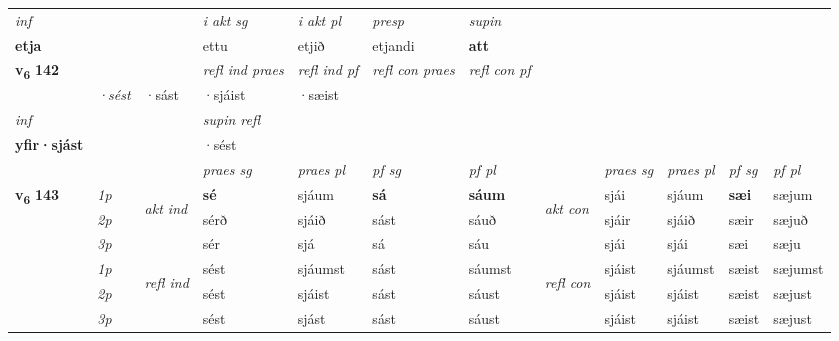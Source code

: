 \begin{longtable}[l]{X>{\footnotesize\itshape}llXXXXlXXXX}
   {\textit{inf}} & &  & \textit{i akt sg} & \textit{i akt pl}   & \textit{presp} & \textit{supin}   \\*
  {\textbf{etja}} & && ettu  & etjið   & etjandi &  \textbf{att}   \\*

\midrule

\multirow{2}{*}{{{\textbf{v{\textsubscript{6}}} \Large{\textbf{142}}}}}  & &&\textit{refl ind praes} & \textit{refl ind pf} & \textit{refl con praes} & \textit{refl con pf} \\*
\multicolumn{3}{r}{\textit{e-m}}& ·sést & ·sást & ·sjáist & ·sæist \\*

\cmidrule{4-7}
   {\textit{inf}} & &       & \textit{supin refl}  \\*
  {\textbf{yfir\allowbreak ·sjást}} & &       & ·sést  \\*

\midrule

 & &   & \textit{praes sg}  & \textit{praes pl}    & \textit{ pf sg} & \textit{pf pl} & & \textit{praes sg}  & \textit{praes pl}    & \textit{pf sg} & \textit{pf pl }  \\ \cmidrule{4-7} \cmidrule{9-12}
 \multirow{2}{*}{{{\textbf{v{\textsubscript{6}}} \Large{\textbf{143}}}}}  & 1p & \multirow{3}{*}{\begin{turn}{90}\textit{akt ind}\end{turn}} & \textbf{sé} & sjáum & \textbf{sá} & \textbf{sáum} & \multirow{3}{*}{\begin{turn}{90}\textit{akt con}\end{turn}} &sjái & sjáum & \textbf{sæi} & sæjum\\*
 & 2p &  &  sérð  & sjáið & sást & sáuð & & sjáir & sjáið & sæir & sæjuð \\*
 & 3p &  & sér & sjá & sá & sáu & & sjái & sjái& sæi & sæju \\*
\cmidrule{4-7} \cmidrule{9-12}
 & 1p & \multirow{3}{*}{\begin{turn}{90}\textit{refl ind}\end{turn}}  & sést & sjáumst & sást & sáumst & \multirow{3}{*}{\begin{turn}{90}\textit{refl con}\end{turn}}  &sjáist & sjáumst & sæist & sæjumst \\*
 & 2p &  & sést & sjáist & sást & sáust & &sjáist & sjáist & sæist & sæjust \\*
 & 3p  & & sést & sjást & sást & sáust & & sjáist & sjáist& sæist & sæjust \\*
\cmidrule{4-7} \cmidrule{9-12}


\end{longtable}
